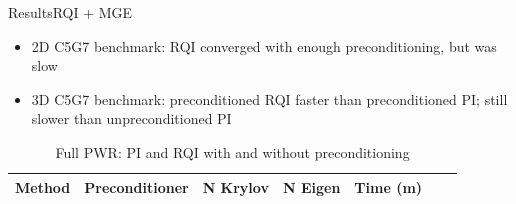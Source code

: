 \documentclass[final]{beamer}
\begin{document}
\begin{frame}{}
\begin{columns}[t]
\begin{column}{.3\linewidth}
   \begin{block}{Results\textemdash RQI + MGE}
	 \begin{itemize}
	 \item{2D C5G7 benchmark: RQI converged with enough preconditioning, but was slow}
	 \item{3D C5G7 benchmark: preconditioned RQI faster than preconditioned PI; 
	  still slower than unpreconditioned PI}
	 \end{itemize}
\vspace*{-0.3 em}
	 \begin{table}[h!]
  \caption{Full PWR: PI and RQI with and without preconditioning}
    \begin{tabular}{ c  c  c  c  c  c  c }
      \hline
      Method & Preconditioner & N Krylov & N Eigen & Time (m) \\
      \hline

\end{tabular}
\end{table}
\end{block}
\end{column}
\end{columns}
\end{frame}
\end{document}
